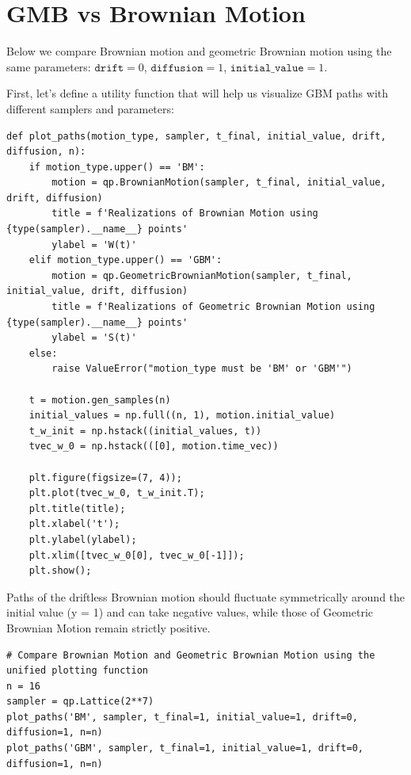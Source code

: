 \documentclass{article}
\begin{document}
\section{GMB vs Brownian Motion}

Below we compare Brownian motion and geometric Brownian motion using the same parameters: $\texttt{drift} = 0$, $\texttt{diffusion} = 1$, $\texttt{initial\_value} = 1$.


First, let's define a utility function that will help us visualize GBM paths with different samplers and parameters:


\begin{verbatim}
def plot_paths(motion_type, sampler, t_final, initial_value, drift, diffusion, n):
    if motion_type.upper() == 'BM':
        motion = qp.BrownianMotion(sampler, t_final, initial_value, drift, diffusion)
        title = f'Realizations of Brownian Motion using {type(sampler).__name__} points'
        ylabel = 'W(t)'
    elif motion_type.upper() == 'GBM':
        motion = qp.GeometricBrownianMotion(sampler, t_final, initial_value, drift, diffusion)
        title = f'Realizations of Geometric Brownian Motion using {type(sampler).__name__} points'
        ylabel = 'S(t)'
    else:
        raise ValueError("motion_type must be 'BM' or 'GBM'")
    
    t = motion.gen_samples(n)
    initial_values = np.full((n, 1), motion.initial_value)
    t_w_init = np.hstack((initial_values, t))
    tvec_w_0 = np.hstack(([0], motion.time_vec))

    plt.figure(figsize=(7, 4));
    plt.plot(tvec_w_0, t_w_init.T); 
    plt.title(title);
    plt.xlabel('t');
    plt.ylabel(ylabel);
    plt.xlim([tvec_w_0[0], tvec_w_0[-1]]);
    plt.show();
\end{verbatim}


Paths of the driftless Brownian motion should fluctuate symmetrically around the initial value (y = 1) and can take negative values, while those of Geometric Brownian Motion remain strictly positive.

\begin{verbatim}
# Compare Brownian Motion and Geometric Brownian Motion using the unified plotting function
n = 16
sampler = qp.Lattice(2**7)
plot_paths('BM', sampler, t_final=1, initial_value=1, drift=0, diffusion=1, n=n)
plot_paths('GBM', sampler, t_final=1, initial_value=1, drift=0, diffusion=1, n=n)
\end{verbatim}
\end{document}

